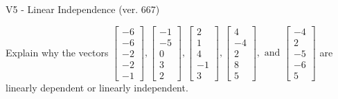 \begin{exercise}
  \begin{exerciseTitle}V5 - Linear Independence (ver. 667)\end{exerciseTitle}
  \begin{exerciseStatement}
    Explain why the vectors \(\left[\begin{array}{r}
-6 \\
-6 \\
-2 \\
-2 \\
-1
\end{array}\right] , \left[\begin{array}{r}
-1 \\
-5 \\
0 \\
3 \\
2
\end{array}\right] , \left[\begin{array}{r}
2 \\
1 \\
4 \\
-1 \\
3
\end{array}\right] , \left[\begin{array}{r}
4 \\
-4 \\
2 \\
8 \\
5
\end{array}\right] , \text{ and } \left[\begin{array}{r}
-4 \\
2 \\
-5 \\
-6 \\
5
\end{array}\right]\) are linearly dependent or linearly independent.	



\end{exerciseStatement}
\end{exercise}
